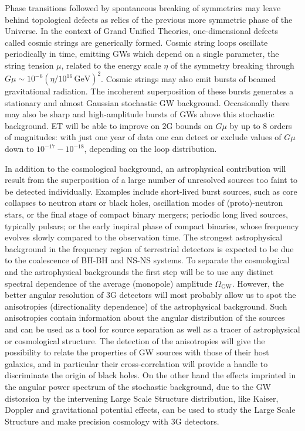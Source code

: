 Phase transitions followed by spontaneous breaking of symmetries may leave behind topological defects as relics of the previous more symmetric phase of the Universe.
In the context of Grand Unified Theories,   one-dimensional defects called cosmic strings are generically formed.%
Cosmic string loops oscillate periodically in time, emitting GWs which depend on a single parameter, the string tension $\mu$, related to the energy scale $\eta$ of the symmetry breaking through $G\mu\sim 10^{-6}(\eta/10^{16}\, \mathrm{GeV})^2$. 
Cosmic strings may also emit bursts of beamed gravitational radiation. The incoherent superposition of these bursts generates a stationary and almost Gaussian stochastic GW background. Occasionally there may also be sharp and high-amplitude bursts of GWs above this stochastic background. 
ET  will be able to improve on 2G bounds on $G\mu$ by up to 8 orders of magnitudes: with just one year of data one can detect or exclude values of $G\mu$ down to  $10^{-17}-10^{-18}$, depending on the loop distribution.
      
In addition to the cosmological background, an astrophysical contribution will  result from the superposition of a large number of unresolved sources too faint to be detected individually. Examples include short-lived burst sources, such as core collapses to neutron stars  or black holes, oscillation modes of (proto)-neutron stars, or the  final stage of compact binary mergers; periodic long lived sources, typically pulsars; or  the early inspiral phase of compact binaries, whose frequency  evolves  slowly compared to the observation time.%
The strongest astrophysical background in the frequency region of terrestrial detectors is expected to be due to the coalescence of BH-BH and  NS-NS systems.   To separate the cosmological and the astrophysical backgrounds the first step will be to use any distinct spectral dependence of the average (monopole) amplitude $\Omega_{\mathrm{GW}}$.
However,  the better angular resolution of 3G detectors will most probably allow us to spot the anisotropies (directionality dependence) of the astrophysical background. Such anisotropies contain information about the angular distribution of the sources and can be used as a tool for source separation as well as a tracer of astrophysical or cosmological structure. The detection of the anisotropies will give the possibility to relate  the properties of GW sources with those of their host galaxies, and in particular their cross-correlation will provide a handle to discriminate the origin of black holes.  On the other hand the effects imprinted in the angular power spectrum of the stochastic background, due to the GW distorsion  by the intervening Large Scale Structure  distribution, like Kaiser, Doppler and gravitational potential effects, can be used to study the Large Scale Structure and  make precision cosmology with 3G detectors.







